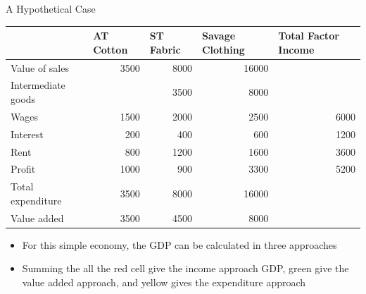 \documentclass[aspectratio=1610]{beamer}
\begin{document}
\begin{frame}[wide]{A Hypothetical Case}
	\begin{table}[htbp]
		\centering
		\begin{tabular}{l|rrr|r}
			\multicolumn{1}{r}{} & \multicolumn{1}{l}{AT Cotton } & \multicolumn{1}{l}{ST Fabric} & \multicolumn{1}{l}{Savage Clothing} & \multicolumn{1}{l}{Total Factor Income} \\
			\midrule
			Value of sales & 3500  & 8000  & \cellcolor[rgb]{ 1,  1,  0}16000 &  \\
			\midrule
			Intermediate goods &       & 3500  & 8000  &  \\
			Wages & 1500  & 2000  & 2500  & \cellcolor[rgb]{ 1,  0,  0}6000 \\
			Interest & 200   & 400   & 600   & \cellcolor[rgb]{ 1,  0,  0}1200 \\
			Rent  & 800   & 1200  & 1600  & \cellcolor[rgb]{ 1,  0,  0}3600 \\
			Profit & 1000  & 900   & 3300  & \cellcolor[rgb]{ 1,  0,  0}5200 \\
			Total expenditure & 3500  & 8000  & 16000 &  \\
			\midrule
			Value added  & \cellcolor[rgb]{ .573,  .816,  .314}3500 & \cellcolor[rgb]{ .573,  .816,  .314}4500 & \cellcolor[rgb]{ .573,  .816,  .314}8000 &  \\
		\end{tabular}%
	\end{table}%
	\begin{itemize}
		\item For this simple economy, the GDP can be calculated in three approaches
		\item Summing the all the red cell give the income approach GDP, green give the value added approach, and yellow gives the expenditure approach
	\end{itemize}
\end{frame}
\end{document}

